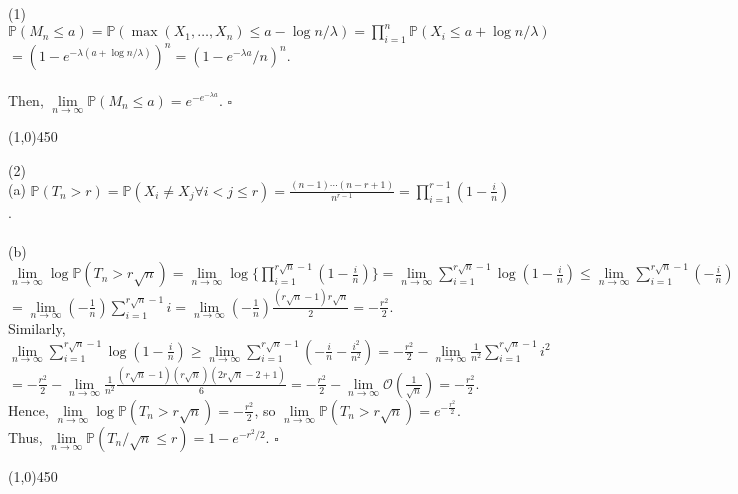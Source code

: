 \documentclass[12pt]{article}
\begin{document}
\def\ci{\perp\!\!\!\perp}
\def\ex{\mathbb{E}}
\def\prob{\mathbb{P}}
\def\ind{\mathbb{I}}

\noindent
(1) $\prob(M_n \leq a) = \prob(\max(X_1,\dots,X_n) \leq a-\log n /\lambda) = \prod\limits_{i=1}^n \prob(X_i\leq a+\log n/\lambda)$\\
\indent\indent $= (1-e^{-\lambda(a+\log n / \lambda)})^n = (1-e^{-\lambda a}/n)^n.$\\ \\
Then, $\lim\limits_{n\to\infty} \prob(M_n \leq a) = e^{-e^{-\lambda a}}.$ $\square$

\begin{center}
\line(1,0){450}
\end{center}

\noindent
(2)\\
(a) $\prob(T_n > r) = \prob(X_i \neq X_j \forall i<j\leq r) = \frac{(n-1)\cdots (n-r+1)}{n^{r-1}}
= \prod_{i=1}^{r-1} (1-\frac{i}{n})$.\\ \\
(b) $\lim\limits_{n\to\infty} \log\prob(T_n > r\sqrt{n})=\lim\limits_{n\to\infty}\log\{\prod_{i=1}^{r\sqrt{n}-1} (1-\frac{i}{n})\} 
= \lim\limits_{n\to\infty}\sum_{i=1}^{r\sqrt{n}-1} \log (1-\frac{i}{n})
\leq \lim\limits_{n\to\infty}\sum_{i=1}^{r\sqrt{n}-1} (-\frac{i}{n})$\\
\indent$= \lim\limits_{n\to\infty} (-\frac{1}{n}) \sum_{i=1}^{r\sqrt{n}-1} i
= \lim\limits_{n\to\infty} (-\frac{1}{n}) \frac{(r\sqrt{n}-1)r\sqrt{n}}{2} = -\frac{r^2}{2}.$\\

\noindent
Similarly, $\lim\limits_{n\to\infty}\sum_{i=1}^{r\sqrt{n}-1} \log (1-\frac{i}{n}) 
\geq \lim\limits_{n\to\infty}\sum_{i=1}^{r\sqrt{n}-1} (-\frac{i}{n}-\frac{i^2}{n^2})
=  -\frac{r^2}{2} - \lim\limits_{n\to\infty} \frac{1}{n^2} \sum_{i=1}^{r\sqrt{n}-1} i^2$\\
\indent $= -\frac{r^2}{2} - \lim\limits_{n\to\infty} \frac{1}{n^2} \frac{(r\sqrt{n}-1)(r\sqrt{n})(2r\sqrt{n}-2+1)}{6}
= -\frac{r^2}{2}-\lim\limits_{n\to\infty} \mathcal{O}(\frac{1}{\sqrt{n}}) = -\frac{r^2}{2}.$\\

\noindent
Hence, $\lim\limits_{n\to\infty} \log\prob(T_n > r\sqrt{n}) = -\frac{r^2}{2}$, so $\lim\limits_{n\to\infty}\prob(T_n>r\sqrt{n}) = e^{-\frac{r^2}{2}}.$\\
Thus, $\lim\limits_{n\to\infty} \prob(T_n/\sqrt{n}\leq r) = 1-e^{-r^2/2}.$ $\square$

\begin{center}
\line(1,0){450}
\end{center}
\end{document}

